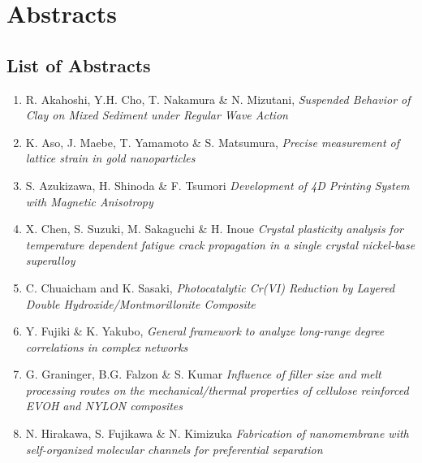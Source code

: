 \section{Abstracts}
\subsection*{List of Abstracts}
\begin{enumerate}[label=A\arabic*]

\item R. Akahoshi,  Y.H. Cho, T. Nakamura  \& N. Mizutani, {\em Suspended Behavior of Clay on Mixed Sediment
under Regular Wave Action}

\item K. Aso, J. Maebe, T. Yamamoto \& S. Matsumura, {\em Precise measurement of lattice strain in gold
nanoparticles}

\item S. Azukizawa, H. Shinoda \&  F. Tsumori {\em Development of 4D Printing System
with Magnetic Anisotropy}

\item X. Chen, S. Suzuki,  M. Sakaguchi \& H. Inoue {\em Crystal plasticity analysis for temperature
dependent fatigue crack propagation in a single
crystal nickel-base superalloy}

\item C. Chuaicham and K. Sasaki, {\em Photocatalytic Cr(VI) Reduction by  Layered
Double Hydroxide/Montmorillonite Composite}

\item Y. Fujiki \& K. Yakubo, {\em General framework to analyze long-range
degree correlations in complex networks}

\item G. Graninger, B.G. Falzon \& S. Kumar {\em Influence of filler size and melt processing routes
on the mechanical/thermal properties of cellulose
reinforced EVOH and NYLON composites}

\item N. Hirakawa, S. Fujikawa \& N. Kimizuka {\em Fabrication of nanomembrane
with self-organized molecular channels
for preferential  separation}


\end{enumerate}
